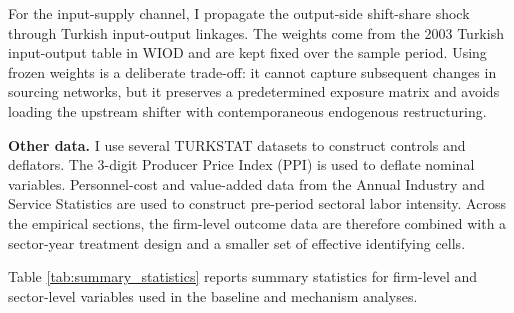 \documentclass[12pt]{article}
\begin{document}
For the input-supply channel, I propagate the output-side shift-share shock through Turkish input-output linkages. The weights come from the 2003 Turkish input-output table in WIOD and are kept fixed over the sample period. Using frozen weights is a deliberate trade-off: it cannot capture subsequent changes in sourcing networks, but it preserves a predetermined exposure matrix and avoids loading the upstream shifter with contemporaneous endogenous restructuring.

\textbf{Other data.} I use several TURKSTAT datasets to construct controls and deflators. The 3-digit Producer Price Index (PPI) is used to deflate nominal variables. Personnel-cost and value-added data from the Annual Industry and Service Statistics are used to construct pre-period sectoral labor intensity. Across the empirical sections, the firm-level outcome data are therefore combined with a sector-year treatment design and a smaller set of effective identifying cells.

Table \ref{tab:summary_statistics} reports summary statistics for firm-level and sector-level variables used in the baseline and mechanism analyses.
\end{document}
